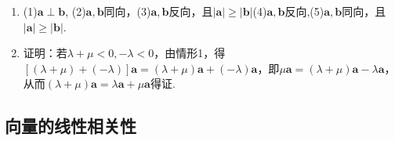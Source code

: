 \documentclass[UTF8]{ctexart}
\begin{document}
\begin{enumerate}
\item (1)$\mathbf{a}\perp\mathbf{b}$, (2)$\mathbf{a},\mathbf{b}$同向，(3)$\mathbf{a},\mathbf{b}$反向，且$|\mathbf{a}| \geq |\mathbf{b}|$(4)$\mathbf{a},\mathbf{b}$反向,(5)$\mathbf{a},\mathbf{b}$同向，且$|\mathbf{a}| \geq |\mathbf{b}|$.

\item 证明：若$\lambda + \mu < 0, -\lambda < 0 $，由情形1，得$\left[\left(\lambda +\mu\right)+(-\lambda)\right]\mathbf{a}=(\lambda +\mu)\mathbf{a}+(-\lambda)\mathbf{a}$，即$\mu \mathbf{a}=(\lambda +\mu)\mathbf{a}-\lambda \mathbf{a}$，从而$(\lambda +\mu)\mathbf{a} = \lambda \mathbf{a}+\mu \mathbf{a}$得证.
\end{enumerate}

\subsection{向量的线性相关性}
\end{document}
